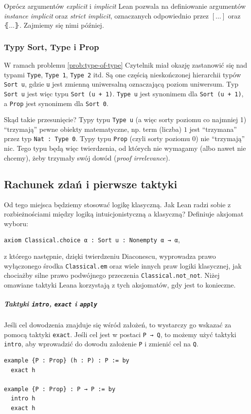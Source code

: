\documentclass[polish,pretty,bibliography=totocnumbered]{angav}
\newcommand{\Lean}[1]{\texttt{#1}}
\newcommand{\centerLean}[2][]{\begin{center}\Lean{#2}#1\end{center}}
\begin{document}
Oprócz argumentów \textit{explicit} i \textit{implicit} Lean pozwala na definiowanie argumentów \textit{instance implicit} oraz \textit{strict implicit}, oznaczanych odpowiednio przez $[\ldots]$ oraz $⦃\ldots⦄$. Zajmiemy się nimi później.

\subsubsection{Typy Sort, Type i Prop}

W ramach problemu \ref{prob:type-of-type} Czytelnik miał okazję zastanowić się nad typami \Lean{Type}, \Lean{Type 1}, \Lean{Type 2} itd.
Są one częścią nieskończonej hierarchii typów \Lean{Sort u}, gdzie \Lean{u} jest zmienną uniwersalną oznaczającą poziom uniwersum.
Typ \Lean{Sort u} jest więc typu \Lean{Sort (u + 1)}.
\Lean{Type u} jest synonimem dla \Lean{Sort (u + 1)}, a \Lean{Prop} jest synonimem dla \Lean{Sort 0}.

Skąd takie przesunięcie? Typy typu \Lean{Type u} (a więc sorty poziomu co najmniej 1) \enquote{trzymają} pewne obiekty matematyczne, np. term (liczba) $1$ jest \enquote{trzymana} przez typ \Lean{Nat : Type 0}.
Typy typu \Lean{Prop} (czyli sorty poziomu 0) nie \enquote{trzymają} nic. Tego typu będą więc twierdzenia, od których nie wymagamy (albo nawet nie chcemy), żeby trzymały swój dowód (\textit{proof irrelevance}).

\subsection{Rachunek zdań i pierwsze taktyki}

Od tego miejsca będziemy stosować logikę klasyczną. Jak Lean radzi sobie z rozbieżnościami między logiką intuicjonistyczną a klasyczną? Definiuje aksjomat wyboru:
\centerLean[,]{axiom Classical.choice {α : Sort u} : Nonempty α → α}
z którego następnie, dzięki twierdzeniu Diaconescu, wyprowadza prawo wyłączonego środka \Lean{Classical.em} oraz wiele innych praw logiki klasycznej, jak chociażby silne prawo podwójnego przeczenia \Lean{Classical.not_not}. Niżej omawiane taktyki Leana korzystają z tych aksjomatów, gdy jest to konieczne.

\subparagraph{Taktyki \texttt{intro}, \texttt{exact} i \texttt{apply}}
Jeśli cel dowodzenia znajduje się wśród założeń, to wystarczy go wskazać za pomocą taktyki \Lean{exact}. Jeśli cel jest w postaci \Lean{P → Q}, to możemy użyć taktyki \Lean{intro}, aby wprowadzić do dowodu założenie \Lean{P} i zmienić cel na \Lean{Q}.
\begin{verbatim}
example {P : Prop} (h : P) : P := by
  exact h

example {P : Prop} : P → P := by
  intro h
  exact h
\end{verbatim}
\end{document}
